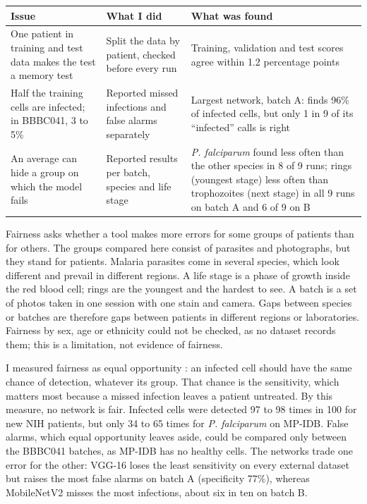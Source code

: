 \documentclass[11pt,a4paper]{article}
\begin{document}
{\small
\begin{longtable}{@{}>{\raggedright\arraybackslash}p{101.1pt}>{\raggedright\arraybackslash}p{95.2pt}>{\raggedright\arraybackslash}p{207.7pt}@{}}
\toprule
Issue & What I did & What was found \\
\midrule
\endhead
\bottomrule
\endfoot
\bottomrule
\endlastfoot
One patient in training and test data makes the test a memory test & Split the data by patient, checked before every run & Training, validation and test scores agree within 1.2 percentage points \\
Half the training cells are infected; in BBBC041, 3 to 5\% & Reported missed infections and false alarms separately & Largest network, batch A: finds 96\% of infected cells, but only 1 in 9 of its ``infected'' calls is right \\
An average can hide a group on which the model fails & Reported results per batch, species and life stage & \emph{P. falciparum} found less often than the other species in 8 of 9 runs; rings (youngest stage) less often than trophozoites (next stage) in all 9 runs on batch A and 6 of 9 on B \\
\end{longtable}}
\addtocounter{table}{-1}

Fairness asks whether a tool makes more errors for some groups of patients than for others. The groups compared here consist of parasites and photographs, but they stand for patients. Malaria parasites come in several species, which look different and prevail in different regions. A life stage is a phase of growth inside the red blood cell; rings are the youngest and the hardest to see. A batch is a set of photos taken in one session with one stain and camera. Gaps between species or batches are therefore gaps between patients in different regions or laboratories. Fairness by sex, age or ethnicity could not be checked, as no dataset records them; this is a limitation, not evidence of fairness.

I measured fairness as equal opportunity \citep{hardt2016}: an infected cell should have the same chance of detection, whatever its group. That chance is the sensitivity, which matters most because a missed infection leaves a patient untreated. By this measure, no network is fair. Infected cells were detected 97 to 98 times in 100 for new NIH patients, but only 34 to 65 times for \emph{P. falciparum} on MP-IDB. False alarms, which equal opportunity leaves aside, could be compared only between the BBBC041 batches, as MP-IDB has no healthy cells. The networks trade one error for the other: VGG-16 loses the least sensitivity on every external dataset but raises the most false alarms on batch A (specificity 77\%), whereas \mbox{MobileNetV2} misses the most infections, about six in ten on batch B.
\end{document}
